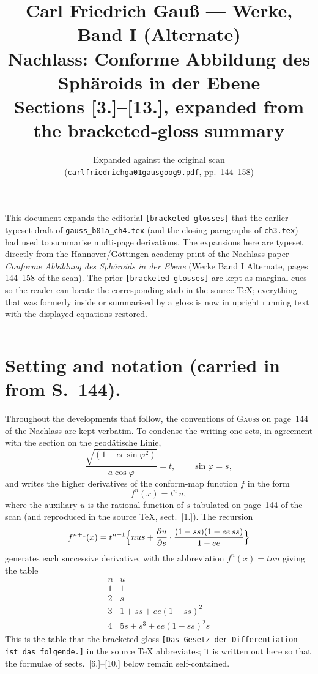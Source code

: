 \documentclass[12pt,a4paper]{article}
\title{Carl Friedrich Gau\ss{} --- Werke, Band I (Alternate)\\
Nachlass: Conforme Abbildung des Sph\"aroids in der Ebene\\
\large{Sections [3.]--[13.], expanded from the bracketed-gloss summary}}
\author{Expanded against the original scan\\(\texttt{carlfriedrichga01gausgoog9.pdf}, pp.\ 144--158)}
\date{}
\begin{document}
\maketitle
\thispagestyle{empty}

\begin{center}\small
This document expands the editorial \texttt{[bracketed glosses]} that the
earlier typeset draft of \texttt{gauss\_b01a\_ch4.tex} (and the closing
paragraphs of \texttt{ch3.tex}) had used to summarise multi-page derivations.
The expansions here are typeset directly from the Hannover/G\"ottingen
academy print of the Nachlass paper \emph{Conforme Abbildung des Sph\"aroids
in der Ebene} (Werke Band I Alternate, pages 144--158 of the scan). The
prior \texttt{[bracketed glosses]} are kept as marginal cues so the reader
can locate the corresponding stub in the source TeX; everything that was
formerly inside or summarised by a gloss is now in upright running text
with the displayed equations restored.
\end{center}

\bigskip
\hrule
\bigskip

\section*{Setting and notation (carried in from S.~144).}

Throughout the developments that follow, the conventions of
\textsc{Gauss} on page~144 of the Nachlass are kept verbatim. To
condense the writing one sets, in agreement with the section on the
geod\"atische Linie,
\[
   \frac{\sqrt{(1-ee\sin\varphi^{2})}}{a\cos\varphi}=t,
   \qquad \sin\varphi=s,
\]
and writes the higher derivatives of the conform-map function $f$ in the
form
\[
   f^{n}(x)=t^{n}\,u,
\]
where the auxiliary $u$ is the rational function of $s$ tabulated on
page~144 of the scan (and reproduced in the source TeX, sect.~[1.]). The
recursion
\[
   f^{n+1}(x)=t^{n+1}\Bigl\{nus+\frac{\partial u}{\partial s}\cdot
       \frac{(1-ss)(1-ee\,ss)}{1-ee}\Bigr\}
\]
generates each successive derivative, with the abbreviation $f^{n}(x)=tnu$
giving the table
\[
\begin{array}{c|c}
n & u\\\hline
1 & 1\\
2 & s\\
3 & 1+ss+ee(1-ss)^{2}\\
4 & 5s+s^{3}+ee(1-ss)^{2}s
\end{array}
\]
This is the table that the bracketed gloss \texttt{[Das Gesetz der
Differentiation ist das folgende.]} in the source TeX abbreviates; it is
written out here so that the formulae of sects.~[6.]--[10.] below
remain self-contained.
\end{document}
